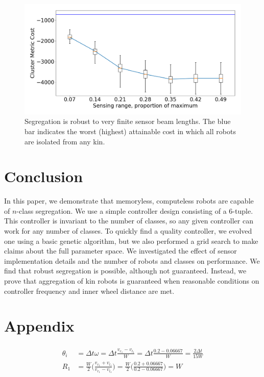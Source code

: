 \documentclass[conference]{IEEEtran}
\begin{document}
    \begin{figure}
      \centering
      \includegraphics[width=1\linewidth]{./images/beam_length.png}
      \caption{Segregation is robust to very finite sensor beam lengths. The blue bar indicates the worst (highest) attainable cost in which all robots are isolated from any kin.}
      \label{fig:beam_length}
    \end{figure}

\section{Conclusion}

  In this paper, we demonstrate that memoryless, computeless robots are capable of $n$-class segregation. We use a simple controller design consisting of a 6-tuple. This controller is invariant to the number of classes, so any given controller can work for any number of classes. To quickly find a quality controller, we evolved one using a basic genetic algorithm, but we also performed a grid search to make claims about the full parameter space. We investigated the effect of sensor implementation details and the number of robots and classes on performance. We find that robust segregation is possible, although not guaranteed. Instead, we prove that aggregation of kin robots is guaranteed when reasonable conditions on controller frequency and inner wheel distance are met.




\onecolumn
\appendix
\section{Appendix}

    \begin{align}
      \begin{split} \label{eq:theta_and_r}
        \theta_i &= \Delta t\omega = \Delta t \frac{v_{r_1} - v_{l_1}}{W} = \Delta t \frac{0.2 - 0.06667}{W} = \frac{2\Delta t}{15W} \\
        R_1 &= \frac{W}{2}\bigg(\frac{v_{r_1} + v_{l_1}}{v_{r_1} - v_{l_1}}\bigg) = \frac{W}{2}\bigg(\frac{0.2 + 0.06667}{0.2 - 0.06667}\bigg) = W
      \end{split}
    \end{align}
\end{document}
